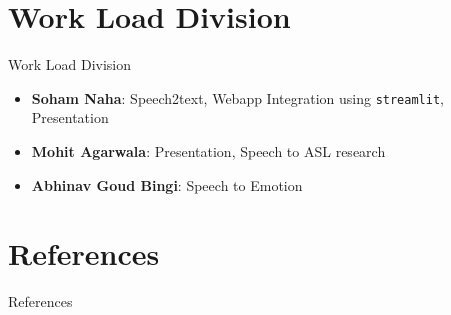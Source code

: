 \documentclass[10pt]{beamer}
\begin{document}
\section{Work Load Division}
\begin{frame}{Work Load Division}
\begin{itemize}
	\item \textbf{Soham Naha}: Speech2text, Webapp Integration using \texttt{streamlit}, Presentation
	\item \textbf{Mohit Agarwala}: Presentation, Speech to ASL research
	\item \textbf{Abhinav Goud Bingi}: Speech to Emotion
\end{itemize}
\end{frame}
 
\section{References}
\begin{frame}{References}
	\tiny    
    \printbibliography
\end{frame}
\end{document}

